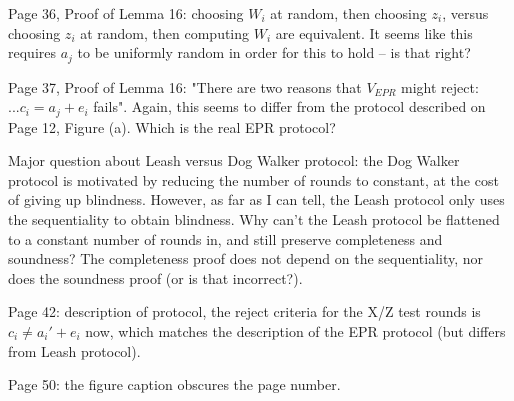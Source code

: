 \documentclass[12pt]{article}
\begin{document}
Page 36, Proof of Lemma 16: choosing $W_i$ at random, then choosing $z_i$, versus choosing $z_i$ at random, then computing $W_i$ are equivalent. It seems like this requires $a_j$ to be uniformly random in order for this to hold -- is that right?

Page 37, Proof of Lemma 16: "There are two reasons that $V_{EPR}$ might reject: $... c_i = a_j + e_i$ fails". Again, this seems to differ from the protocol described on Page 12, Figure (a). Which is the real EPR protocol?

Major question about Leash versus Dog Walker protocol: the Dog Walker protocol is motivated by reducing the number of rounds to constant, at the cost of giving up blindness. However, as far as I can tell, the Leash protocol only uses the sequentiality to obtain blindness. Why can't the Leash protocol be flattened to a constant number of rounds in, and still preserve completeness and soundness? The completeness proof does not depend on the sequentiality, nor does the soundness proof (or is that incorrect?).

Page 42: description of protocol, the reject criteria for the X/Z test rounds is $c_i \neq a_i' + e_i$ now, which matches the description of the EPR protocol (but differs from Leash protocol).

Page 50: the figure caption obscures the page number.
\end{document}
